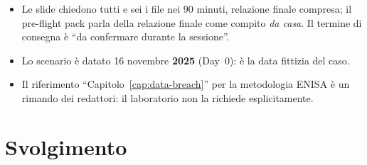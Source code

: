 \begin{verifica}
\begin{itemize}
  \item Le slide chiedono tutti e sei i file nei 90 minuti, relazione finale compresa; il pre-flight
    pack parla della relazione finale come compito \emph{da casa}. Il termine di consegna è ``da
    confermare durante la sessione''.
  \item Lo scenario è datato 16 novembre \textbf{2025} (Day~0): è la data fittizia del caso.
  \item Il riferimento ``Capitolo~\ref{cap:data-breach}'' per la metodologia ENISA è un rimando dei
    redattori: il laboratorio non la richiede esplicitamente.
\end{itemize}
\end{verifica}

\section{Svolgimento}
